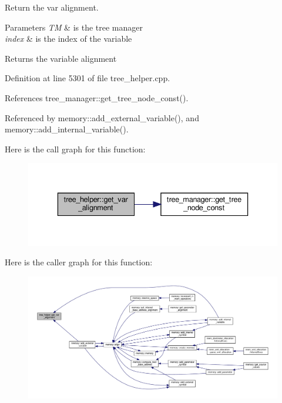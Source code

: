 Return the var alignment. 


\begin{DoxyParams}{Parameters}
{\em TM} & is the tree manager \\
\hline
{\em index} & is the index of the variable \\
\hline
\end{DoxyParams}
\begin{DoxyReturn}{Returns}
the variable alignment 
\end{DoxyReturn}


Definition at line 5301 of file tree\+\_\+helper.\+cpp.



References tree\+\_\+manager\+::get\+\_\+tree\+\_\+node\+\_\+const().



Referenced by memory\+::add\+\_\+external\+\_\+variable(), and memory\+::add\+\_\+internal\+\_\+variable().

Here is the call graph for this function\+:
\nopagebreak
\begin{figure}[H]
\begin{center}
\leavevmode
\includegraphics[width=336pt]{d7/d99/classtree__helper_a112bb01a10176c6cb052bde46ea1c369_cgraph}
\end{center}
\end{figure}
Here is the caller graph for this function\+:
\nopagebreak
\begin{figure}[H]
\begin{center}
\leavevmode
\includegraphics[width=350pt]{d7/d99/classtree__helper_a112bb01a10176c6cb052bde46ea1c369_icgraph}
\end{center}
\end{figure}
\mbox{\label{classtree__helper_a138ece972399ec580cd0f48ef6a3b0e9}} 
